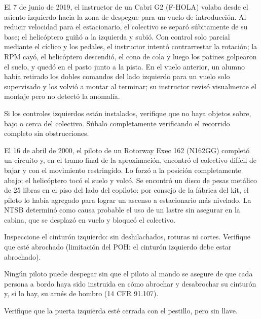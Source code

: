 \begin{caso}
El 7 de junio de 2019, el instructor de un Cabri G2 (F-HOLA) volaba desde el asiento izquierdo hacia la zona de despegue para un vuelo de introducción. Al reducir velocidad para el estacionario, el colectivo se separó súbitamente de su base; el helicóptero guiñó a la izquierda y subió. Con control solo parcial mediante el cíclico y los pedales, el instructor intentó contrarrestar la rotación; la RPM cayó, el helicóptero descendió, el cono de cola y luego los patines golpearon el suelo, y quedó en el pasto junto a la pista. En el vuelo anterior, un alumno había retirado los dobles comandos del lado izquierdo para un vuelo solo supervisado y los volvió a montar al terminar; su instructor revisó visualmente el montaje pero no detectó la anomalía.
\end{caso}

Si los controles izquierdos están instalados, verifique que no haya objetos sobre, bajo o cerca del colectivo. Súbalo completamente verificando el recorrido completo sin obstrucciones.

\begin{caso}
El 16 de abril de 2000, el piloto de un Rotorway Exec 162 (N162GG) completó un circuito y, en el tramo final de la aproximación, encontró el colectivo difícil de bajar y con el movimiento restringido. Lo forzó a la posición completamente abajo; el helicóptero tocó el suelo y volcó. Se encontró un disco de pesas metálico de 25 libras en el piso del lado del copiloto: por consejo de la fábrica del kit, el piloto lo había agregado para lograr un ascenso a estacionario más nivelado. La NTSB determinó como causa probable el uso de un lastre sin asegurar en la cabina, que se desplazó en vuelo y bloqueó el colectivo.
\end{caso}

Inspeccione el cinturón izquierdo: sin deshilachados, roturas ni cortes. Verifique que esté abrochado (limitación del POH: el cinturón izquierdo debe estar abrochado).

\begin{nota}
Ningún piloto puede despegar sin que el piloto al mando se asegure de que cada persona a bordo haya sido instruida en cómo abrochar y desabrochar su cinturón y, si lo hay, su arnés de hombro (14 CFR 91.107).
\end{nota}

Verifique que la puerta izquierda esté cerrada con el pestillo, pero sin llave.

